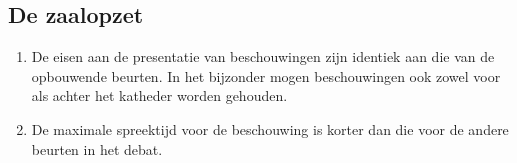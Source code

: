 \subsection{De zaalopzet }

\begin{enumerate}
\item De eisen aan de presentatie van beschouwingen zijn identiek aan die van de opbouwende beurten. In het bijzonder mogen beschouwingen ook zowel voor als achter het katheder worden gehouden.
\item De maximale spreektijd voor de beschouwing is korter dan die voor de andere beurten in het debat.
\end{enumerate}
